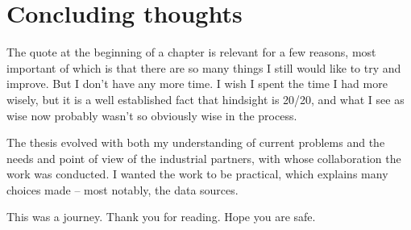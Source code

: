 \section{Concluding thoughts}

The quote at the beginning of a chapter is relevant for a few reasons, most important of which is that there are so many things I still would like to try and improve.
But I don't have any more time.
I wish I spent the time I had more wisely, but it is a well established fact that hindsight is 20/20, and what I see as wise now probably wasn't so obviously wise in the process.

The thesis evolved with both my understanding of current problems and the needs and point of view of the industrial partners, with whose collaboration the work was conducted.
I wanted the work to be practical, which explains many choices made – most notably, the data sources.

This was a journey.
Thank you for reading.
Hope you are safe.
